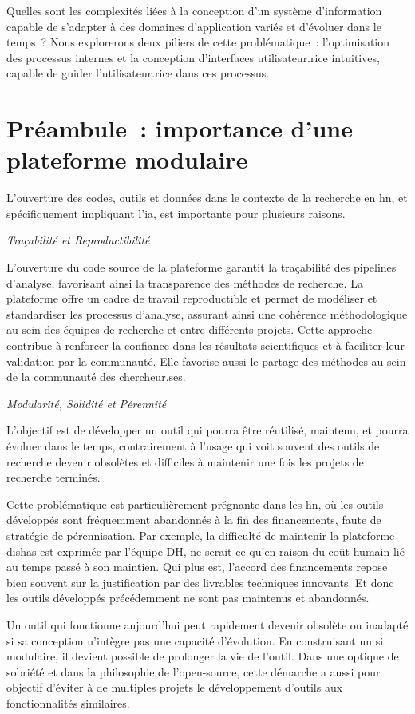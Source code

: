 \documentclass[a4paper,12pt,twoside]{book}
\newcommand{\dishas}{\gls{dishas}\xspace}
\newcommand{\ia}{\gls{ia}\xspace}
\newcommand{\hn}{\gls{hn}\xspace}
\newcommand{\si}{\gls{si}\xspace}
\newcommand{\clearemptydoublepage}{\newpage{\pagestyle{empty}\cleardoublepage}}
\newcommand\chapterNo[1]{%
 \chapter*{#1}
  \markboth{}{} %
  \markright{\MakeUppercase{#1}}
}
\begin{document}
Quelles sont les complexités liées à la conception d'un système
d'information capable de s'adapter à des domaines d'application variés
et d'évoluer dans le temps~? Nous explorerons deux piliers de cette
problématique~: l'optimisation des processus internes et la conception
d'interfaces utilisateur.rice intuitives, capable de guider l'utilisateur.rice
dans ces processus.

\clearemptydoublepage

\hypertarget{preambule}{%
\chapterNo{Préambule~: importance d'une plateforme modulaire}\label{preambule}}
        
      L'ouverture des codes, outils et données dans le contexte de la
recherche en \hn, et spécifiquement impliquant l'\ia, est
importante pour plusieurs raisons.

\emph{Traçabilité et Reproductibilité}

L'ouverture du code source de la plateforme garantit la traçabilité des
pipelines d'analyse, favorisant ainsi la transparence des méthodes de
recherche. La plateforme offre un cadre de travail reproductible et
permet de modéliser et standardiser les processus d'analyse, assurant
ainsi une cohérence méthodologique au sein des équipes de recherche et
entre différents projets. Cette approche contribue à renforcer la
confiance dans les résultats scientifiques et à faciliter leur
validation par la communauté. Elle favorise aussi le partage des méthodes au sein de la communauté des chercheur.ses. 

\emph{Modularité, Solidité et Pérennité}

L'objectif est de développer un outil qui pourra être réutilisé,
maintenu, et pourra évoluer dans le temps, contrairement à l'usage
qui voit souvent des outils de recherche devenir obsolètes et difficiles
à maintenir une fois les projets de recherche terminés.

Cette problématique est particulièrement prégnante dans les \hn, où les outils développés sont fréquemment abandonnés à la
fin des financements, faute de stratégie de pérennisation. Par exemple,
la difficulté de maintenir la plateforme \dishas est exprimée par
l'équipe DH, ne serait-ce qu'en raison du coût humain lié au temps passé
à son maintien. Qui plus est, l'accord des financements repose bien
souvent sur la justification par des livrables techniques innovants. Et
donc les outils développés précédemment ne sont pas maintenus et
abandonnés.

Un outil qui fonctionne aujourd'hui peut rapidement devenir obsolète ou
inadapté si sa conception n'intègre pas une capacité d'évolution. En
construisant un \si modulaire, il devient possible de prolonger la vie de
l'outil. Dans une optique de sobriété et dans la philosophie de l'open-source, cette démarche a aussi pour objectif d'éviter à de multiples
projets le développement d'outils aux fonctionnalités similaires.
\end{document}

